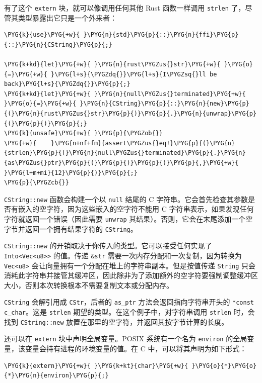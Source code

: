 有了这个 \texttt{extern} 块，就可以像调用任何其他 Rust 函数一样调用 \texttt{strlen} 了，尽管其类型暴露出它只是一个外来者：

\begin{Verbatim}[commandchars=\\\{\},breaklines=true,breakanywhere=true,fontsize=\codefont,xleftmargin=17bp]
\PYG{k}{use}\PYG{+w}{ }\PYG{n}{std}\PYG{p}{::}\PYG{n}{ffi}\PYG{p}{::}\PYG{n}{CString}\PYG{p}{;}

\PYG{k+kd}{let}\PYG{+w}{ }\PYG{n}{rust\PYGZus{}str}\PYG{+w}{ }\PYG{o}{=}\PYG{+w}{ }\PYG{l+s}{\PYGZdq{}}\PYG{l+s}{I\PYGZsq{}ll be back}\PYG{l+s}{\PYGZdq{}}\PYG{p}{;}
\PYG{k+kd}{let}\PYG{+w}{ }\PYG{n}{null\PYGZus{}terminated}\PYG{+w}{ }\PYG{o}{=}\PYG{+w}{ }\PYG{n}{CString}\PYG{p}{::}\PYG{n}{new}\PYG{p}{(}\PYG{n}{rust\PYGZus{}str}\PYG{p}{)}\PYG{p}{.}\PYG{n}{unwrap}\PYG{p}{(}\PYG{p}{)}\PYG{p}{;}
\PYG{k}{unsafe}\PYG{+w}{ }\PYG{p}{\PYGZob{}}
\PYG{+w}{    }\PYG{n+nf+fm}{assert\PYGZus{}eq!}\PYG{p}{(}\PYG{n}{strlen}\PYG{p}{(}\PYG{n}{null\PYGZus{}terminated}\PYG{p}{.}\PYG{n}{as\PYGZus{}ptr}\PYG{p}{(}\PYG{p}{)}\PYG{p}{)}\PYG{p}{,}\PYG{+w}{ }\PYG{l+m+mi}{12}\PYG{p}{)}\PYG{p}{;}
\PYG{p}{\PYGZcb{}}
\end{Verbatim}

\texttt{CString::new} 函数会构建一个以 \texttt{null} 结尾的 C 字符串。它会首先检查其参数是否有嵌入的空字符，因为这些嵌入的空字符不能用 C 字符串表示，如果发现任何字符就返回一个错误（因此需要 \texttt{unwrap} 其结果）。否则，它会在末尾添加一个空字节并返回一个拥有结果字符的 \texttt{CString}。

\texttt{CString::new} 的开销取决于你传入的类型。它可以接受任何实现了 \texttt{Into<Vec<u8>>} 的值。传递 \texttt{\&str} 需要一次内存分配和一次复制，因为转换为 \texttt{Vec<u8>} 会让向量拥有一个分配在堆上的字符串副本。但是按值传递 \texttt{String} 只会消耗此字符串并接管其缓冲区，因此除非为了添加额外的空字符要强制调整缓冲区大小，否则本次转换根本不需要复制文本或分配内存。

\texttt{CString} 会解引用成 \texttt{CStr}，后者的 \texttt{as\_ptr} 方法会返回指向字符串开头的 \texttt{*const c\_char}。这是 \texttt{strlen} 期望的类型。在这个例子中，对字符串调用 \texttt{strlen} 时，会找到 \texttt{CString::new} 放置在那里的空字符，并返回其按字节计算的长度。

还可以在 \texttt{extern} 块中声明全局变量。POSIX 系统有一个名为 \texttt{environ} 的全局变量，该变量会持有进程的环境变量的值。在 C 中，可以将其声明为如下形式：

\begin{Verbatim}[commandchars=\\\{\},breaklines=true,breakanywhere=true,fontsize=\codefont,xleftmargin=17bp]
\PYG{k}{extern}\PYG{+w}{ }\PYG{k+kt}{char}\PYG{+w}{ }\PYG{o}{*}\PYG{o}{*}\PYG{n}{environ}\PYG{p}{;}
\end{Verbatim}

